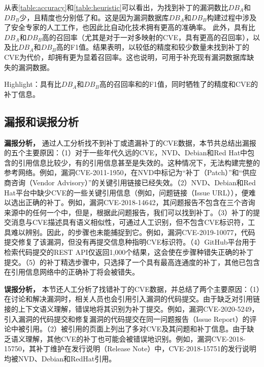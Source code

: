 从表\ref{table:accuracy}和\ref{table:heuristic}可以看出，\tool 为找到补丁的漏洞数比$DB_A$和$DB_B$少，且精度也分别低了和。这是因为漏洞数据库$DB_A$和$DB_B$构建过程中涉及了安全专家的人工工作，也因此比自动化技术拥有更高的准确率。
此外，\tool 具有比$DB_A$和$DB_B$高的召回率（尤其是对于一对多映射的CVE，\tool 具有更高的召回率），以及比$DB_A$和$DB_B$高的F1值。结果表明，\tool 以较低的精度和较少数量未找到补丁的CVE为代价，却拥有更为显着召回率。这也说明，\tool 可用于补充现有漏洞数据库缺失的漏洞数据。

\begin{tcolorbox}[size=title,opacityfill=0.15]
Highlight：\tool 具有比$DB_A$和$DB_B$高的召回率和的F1值，同时牺牲了的精度和CVE的补丁信息。
\end{tcolorbox}

\subsection{\tool 漏报和误报分析}

\textbf{漏报分析，}
通过人工分析\tool 找不到补丁或遗漏补丁的CVE数据，本节共总结出\tool 漏报的五个主要原因：（1）对于一些年代久远的CVE，NVD、Debian和Red Hat中包含的引用信息比较少，有的引用信息甚至是失效的。这种情况下，\tool 无法构建完整的参考网络。例如，漏洞CVE-2011-1950，在NVD\cite{CVE-2011-1950}中标记为“补丁（Patch）”和“供应商咨询（Vendor Advisory）”的关键引用链接已经失效。（2）NVD、Debian和Red Hat平台中缺少CVE的一些关键引用信息（例如，问题链接（Issue URL）），\tool 便难以选出正确的补丁。例如，漏洞CVE-2018-14642，其问题报告\cite{UNDERTOW-1430}不包含在三个咨询来源中的任何一个中，但是，根据此问题报告，我们可以找到补丁\cite{undertow}。（3）补丁的提交消息与CVE描述具有语义相似性，可通过人工识别，但不包含CVE标识符，工具难以辨别。因此，\tool 的步骤也未能捕捉到它。例如，漏洞CVE-2019-10077\cite{CVE-2019-10077}，代码提交\cite{jspwiki}修复了该漏洞，但没有再提交信息种指明CVE标识符。（4）GitHub平台用于检索代码提交的REST API仅返回1,000个结果，这会使\tool 在步骤种错失正确的补丁提交。（5）\tool 的补丁精选步骤中，只选择了一个具有最高连通度的补丁，其他已包含在引用信息网络中的正确补丁将会被\tool 错失。

\textbf{误报分析，}
本节还人工分析了\tool 找错补丁的CVE数据，并总结了两个主要原因：（1）在讨论和解决漏洞时，相关人员也会引用引入漏洞的代码提交。由于\tool 缺乏对引用链接的上下文语义理解，\tool 错误地将其识别为补丁提交。例如，漏洞CVE-2020-5249，引入漏洞的代码提交\cite{go-ethereum-1}和修复漏洞的代码提交\cite{go-ethereum-2}在同一问题报告（Issue Report）的评论中被引用。（2）被引用的页面上列出了多对CVE及其问题和补丁信息。由于\tool 缺乏语义理解，其他CVE的补丁也可能会被\tool 错误地识别。例如，漏洞CVE-2018-15750，其补丁维护在发行说明（Release Note）\cite{release-note}中，CVE-2018-15751的发行说明均被NVD、Debian和RedHat引用。


